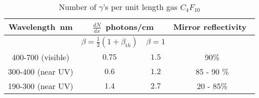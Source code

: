 \begin{table}[h!]
\begin{minipage}{\textwidth}
\begin{center}
\begin{singlespacing}

\caption[Number of Photo-electrons per Unit Length in Cherenkov Detection]{\label{tab:cc_npe}Number of $\gamma$'s per unit length gas $C_4F_10$ \vspace{0.75mm}}

\begin{tabular}{c|c|c|c}

\hline
Wavelength~nm & \multicolumn{2}{c|}{$\frac{dN}{dx}$~photons/cm} & Mirror reflectivity~\cite{clas.cc}  \vspace{0.5mm} \\
\hline
&$\beta = \frac{1}{2}(1+\beta_{th})$& $\beta = 1$ \\
\hline
400-700 (visible) & $0.75$ & $1.5$ & 90\% \\
300-400 (near UV) & $0.6$ & $1.2$ & 85 - 90 \% \\
190-300 (near UV) & $1.4$ & $2.7$ & 20 - 85\% \\
\hline \hline
\end{tabular}
\end{singlespacing}
\end{center}
\end{minipage}
\end{table}
\vspace{20pt}
